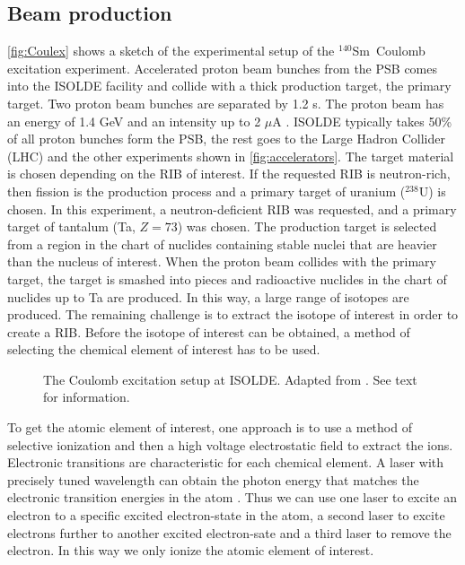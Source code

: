 \documentclass[twoside,english]{uiofysmaster/uiofysmaster}
\newcommand{\Sm}{$^{140}$Sm} %
\let\orgautoref\autoref
\renewcommand{\autoref}
        {%
		 \def\subsectionautorefname{Section}%
		 \def\subsubsectionautorefname{Section}%
          \orgautoref}
\begin{document}
\subsection{Beam production}
\autoref{fig:Coulex} shows a sketch of the experimental setup of the \Sm\ Coulomb excitation experiment. 
Accelerated proton beam bunches from the PSB comes into the ISOLDE facility and collide with a thick production target, the primary target. 
Two proton beam bunches are separated by 1.2 s.
The proton beam has an energy of 1.4 GeV and an intensity up to 2 $\mu$A \cite{TIF, TIF2013}. 
ISOLDE typically takes 50\% \cite{MB-spect} of all proton bunches form the PSB, the rest goes to the Large Hadron Collider (LHC) and the other experiments shown in \autoref{fig:accelerators}. 
The target material is chosen depending on the RIB of interest. 
If the requested RIB is neutron-rich, then fission is the production process and a primary target of uranium ($^{238}$U) is chosen. 
In this experiment, a neutron-deficient RIB was requested, and a primary target of tantalum (Ta, $Z = 73$) was chosen.
The production target is selected from a region in the chart of nuclides containing stable nuclei that are heavier than the nucleus of interest.
When the proton beam collides with the primary target, the target is smashed into pieces and radioactive nuclides in the chart of nuclides up to Ta are produced.
In this way, a large range of isotopes are produced. 
The remaining challenge is to extract the isotope of interest in order to create a RIB. 
Before the isotope of interest can be obtained, a method of selecting the chemical element of interest has to be used.

\begin{figure}[ht]
	\centering
	
	\caption{The Coulomb excitation setup at ISOLDE. Adapted from \cite{Klintefjord}. See text for information.}
	\label{fig:Coulex}
\end{figure}

To get the atomic element of interest, one approach is to use a method of selective ionization and then a high voltage electrostatic field to extract the ions. 
Electronic transitions are characteristic for each chemical element. 
A laser with precisely tuned wavelength can obtain the photon energy that matches the electronic transition energies in the atom \cite{RILIS-web, RILIS2013}. 
Thus we can use one laser to excite an electron to a specific excited electron-state in the atom, a second laser to excite electrons further to another excited electron-sate and a third laser to remove the electron. 
In this way we only ionize the atomic element of interest. 
\end{document}
